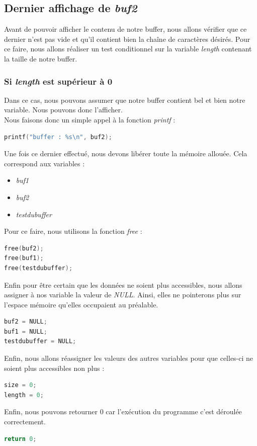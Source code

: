 \subsection{Dernier affichage de \textit{buf2}}

Avant de pouvoir afficher le contenu de notre buffer, nous allons vérifier que ce dernier n'est pas vide et qu'il contient bien la chaîne de caractères désirés. Pour ce faire, nous allons réaliser un test conditionnel sur la variable \textit{length} contenant la taille de notre buffer.

\subsubsection{Si \textit{length} est supérieur à 0}\label{sec:if}

Dans ce cas, nous pouvons assumer que notre buffer contient bel et bien notre variable. Nous pouvons donc l'afficher.\\
Nous faisons donc un simple appel à la fonction \textit{printf} :
\begin{lstlisting}[language=C]
printf("buffer : %s\n", buf2);
\end{lstlisting}
Une fois ce dernier effectué, nous devons libérer toute la mémoire allouée. Cela correspond aux variables :
\begin{itemize}
 \item \textit{buf1}
 \item \textit{buf2}
 \item \textit{testdubuffer}
\end{itemize}
Pour ce faire, nous utilisons la fonction \textit{free} :
\begin{lstlisting}[language=C]
free(buf2);
free(buf1);
free(testdubuffer);
\end{lstlisting}
Enfin pour être certain que les données ne soient plus accessibles, nous allons assigner à nos variable la valeur de \textit{NULL}. Ainsi, elles ne pointerons plus sur l'espace mémoire qu'elles occupaient au préalable.
\begin{lstlisting}[language=C]
buf2 = NULL;
buf1 = NULL;
testdubuffer = NULL;
\end{lstlisting}
Enfin, nous allons réassigner les valeurs des autres variables pour que celles-ci ne soient plus accessibles non plus :
\begin{lstlisting}[language=C]
size = 0;
length = 0;
\end{lstlisting}
Enfin, nous pouvons retourner 0 car l'exécution du programme c'est déroulée correctement.
\begin{lstlisting}[language=C]
return 0;
\end{lstlisting}

